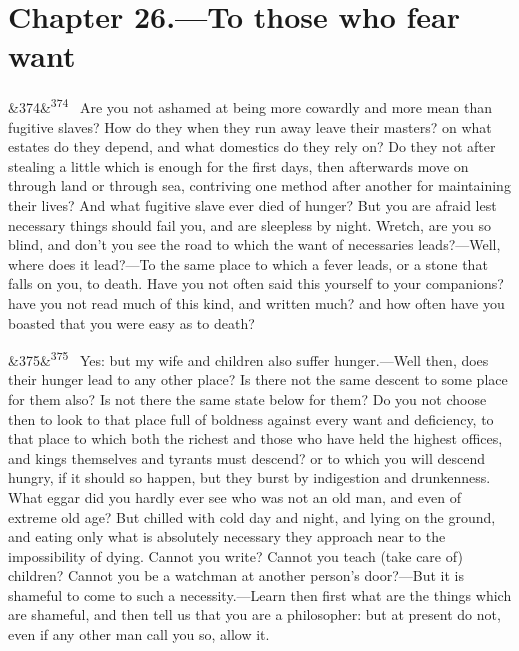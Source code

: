 \documentclass[12pt]{article}
\newcommand{\para}[1][]{\par\noindent\ifx&#1&\else\textsuperscript{\footnotesize #1}~\fi}
\begin{document}
\section*{Chapter 26.---To those who fear want}

\para[374] Are you not ashamed at being more cowardly and more mean than fugitive slaves? How do they when they run away leave their masters? on what estates do they depend, and what domestics do they rely on? Do they not after stealing a little which is enough for the first days, then afterwards move on through land or through sea, contriving one method after another for maintaining their lives? And what fugitive slave ever died of hunger? But you are afraid lest necessary things should fail you, and are sleepless by night. Wretch, are you so blind, and don't you see the road to which the want of necessaries leads?—Well, where does it lead?—To the same place to which a fever leads, or a stone that falls on you, to death. Have you not often said this yourself to your companions? have you not read much of this kind, and written much? and how often have you boasted that you were easy as to death?

\para[375] Yes: but my wife and children also suffer hunger.—Well then, does their hunger lead to any other place? Is there not the same descent to some place for them also? Is not there the same state below for them? Do you not choose then to look to that place full of boldness against every want and deficiency, to that place to which both the richest and those who have held the highest offices, and kings themselves and tyrants must descend? or to which you will descend hungry, if it should so happen, but they burst by indigestion and drunkenness. What eggar did you hardly ever see who was not an old man, and even of extreme old age? But chilled with cold day and night, and lying on the ground, and eating only what is absolutely necessary they approach near to the impossibility of dying. Cannot you write? Cannot you teach (take care of) children? Cannot you be a watchman at another person's door?—But it is shameful to come to such a necessity.—Learn then first what are the things which are shameful, and then tell us that you are a philosopher: but at present do not, even if any other man call you so, allow it.
\end{document}
